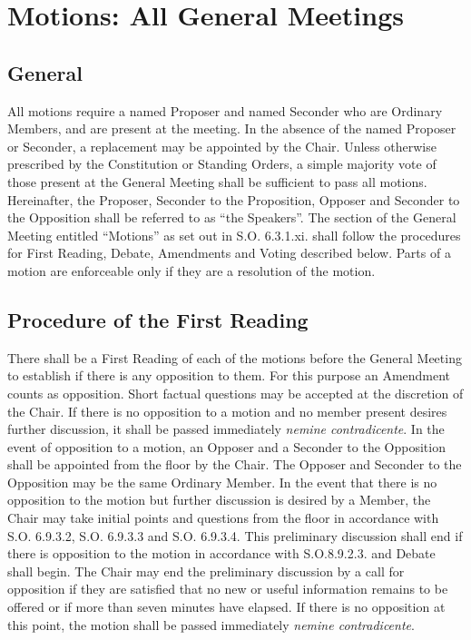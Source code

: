 \section{Motions: All General Meetings}
\subsection{General}
\npara All motions require a named Proposer and named Seconder who are Ordinary Members, and are present at the meeting. In the absence of the named Proposer or Seconder, a replacement may be appointed by the Chair.
\npara Unless otherwise prescribed by the Constitution or Standing Orders, a simple majority vote of those present at the General Meeting shall be sufficient to pass all motions.
\npara Hereinafter, the Proposer, Seconder to the Proposition, Opposer and Seconder to the Opposition shall be referred to as ``the Speakers''.
\npara The section of the General Meeting entitled ``Motions'' as set out in S.O. 6.3.1.xi. shall follow the procedures for First Reading, Debate, Amendments and Voting described below.
\npara Parts of a motion are enforceable only if they are a resolution of the motion.

\subsection{Procedure of the First Reading}
\npara There shall be a First Reading of each of the motions before the General Meeting to establish if there is any opposition to them. For this purpose an Amendment counts as opposition. Short factual questions may be accepted at the discretion of the Chair.
\npara If there is no opposition to a motion and no member present desires further discussion, it shall be passed immediately \textit{nemine contradicente}.
\npara In the event of opposition to a motion, an Opposer and a Seconder to the Opposition shall be appointed from the floor by the Chair.  The Opposer and Seconder to the Opposition may be the same Ordinary Member.
\npara In the event that there is no opposition to the motion but further discussion is desired by a Member, the Chair may take initial points and questions from the floor in accordance with S.O. 6.9.3.2, S.O. 6.9.3.3 and S.O. 6.9.3.4.
\npara This preliminary discussion shall end if there is opposition to the motion in accordance with S.O.8.9.2.3. and Debate shall begin.  
\npara The Chair may end the preliminary discussion by a call for opposition if they are satisfied that no new or useful information remains to be offered or if more than seven minutes have elapsed. If there is no opposition at this point, the motion shall be passed immediately \textit{nemine contradicente}.
